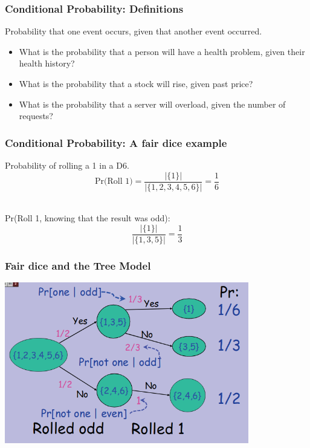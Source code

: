 \documentclass{beamer}
\begin{document}
\begin{frame}
  \frametitle{Conditional Probability: Definitions}

  {\large
    Probability that one event occurs, given that another event
    occurred.

    \bigskip

    \begin{itemize}
    \item What is the probability that a person will have a health
      problem, given their health history?
      \bigskip
      
    \item What is the probability that a stock will rise, given past
      price?
      \bigskip

    \item What is the probability that a server will overload, given
      the number of requests?
    \end{itemize}
  }
\end{frame}

\begin{frame}
  \frametitle{Conditional Probability: A fair dice example}

  {\large

    Probability of rolling a 1 in a D6.
    \begin{equation*}
    \text{Pr(Roll 1)} = \frac{|\{1\}|}{|\{1,2,3,4,5,6\}|} =
    \frac{1}{6}
    \end{equation*}

    \bigskip
    \\
    Pr(Roll 1, knowing that the result was odd):
    \begin{equation*}
      \frac{|\{1\}|}{|\{1,3,5\}|} =
    \frac{1}{3}
    \end{equation*}
  }
\end{frame}

\begin{frame}
  \frametitle{Fair dice and the Tree Model}
  \begin{center}
    \includegraphics[width=0.8\textwidth]{../img/roll_1}
  \end{center}
\end{frame}
\end{document}
